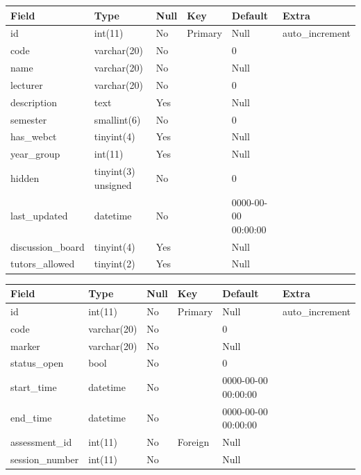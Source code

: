 \documentclass[12pt]{article}
\begin{document}
				
					\begin{tabular}{|p{1.5in}|p{0.9in}|p{0.5in}|p{1.0in}|p{0.65in}|p{1.1in}|} \hline
					Field & Type & Null & Key & Default & Extra \\ \hline
					id & int(11) & No & Primary & Null & auto\_increment \\ \hline
					code & varchar(20) & No &  & 0 &  \\ \hline
					name & varchar(20) & No &  & Null &  \\ \hline
					lecturer  & varchar(20) & No &  & 0 &  \\ \hline
					description & text & Yes &  & Null &  \\ \hline
					semester & smallint(6) & No &  & 0 &  \\ \hline
					has\_webct & tinyint(4) & Yes &  & Null &  \\ \hline
					year\_group & int(11) & Yes &  & Null &  \\ \hline
					hidden & tinyint(3) unsigned & No &  & 0 &  \\ \hline
					last\_updated & datetime & No &  & 0000-00-00 00:00:00 &  \\ \hline
					discussion\_board & tinyint(4) & Yes &  & Null &  \\ \hline
					tutors\_allowed & tinyint(2) & Yes &  & Null &  \\
					\hline
					\end{tabular}



					\begin{tabular}{|p{1.5in}|p{0.9in}|p{0.5in}|p{1.0in}|p{0.65in}|p{1.1in}|} \hline
					Field & Type & Null & Key & Default & Extra \\ \hline
					id & int(11) & No & Primary & Null & auto\_increment \\ \hline
					code & varchar(20) & No &  & 0 &  \\ \hline
					marker & varchar(20) & No &  & Null &  \\ \hline
					status\_open & bool & No &  & 0 &  \\ \hline
					start\_time & datetime & No &  & 0000-00-00 00:00:00 &  \\ \hline
					end\_time & datetime & No &  & 0000-00-00 00:00:00 &  \\ \hline
					assessment\_id & int(11) & No & Foreign & Null &  \\ \hline
					session\_number & int(11) & No &  & Null &  \\ \hline
					\end{tabular}
					
\end{document}
